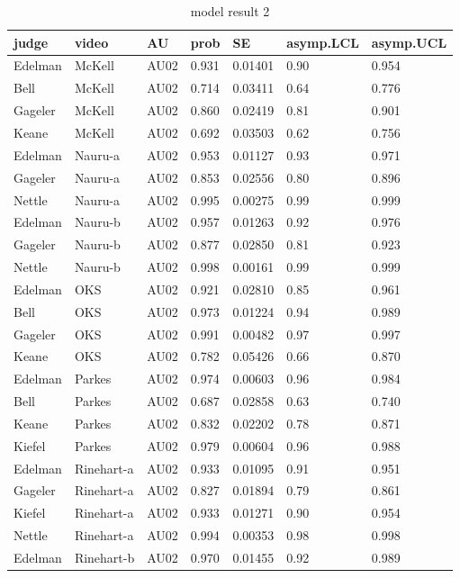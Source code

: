\documentclass{monashthesis}
\begin{document}
\begin{center}
\begin{longtable}{lllllll}
\caption{\label{tab:result_2} model result 2}\\
\toprule
judge & video & AU & prob & SE & asymp.LCL & asymp.UCL \\
\midrule
\endhead
\bottomrule
\endfoot
Edelman & McKell & AU02 & 0.931 & 0.01401 & 0.90 & 0.954 \\
Bell & McKell & AU02 & 0.714 & 0.03411 & 0.64 & 0.776 \\
Gageler & McKell & AU02 & 0.860 & 0.02419 & 0.81 & 0.901 \\
Keane & McKell & AU02 & 0.692 & 0.03503 & 0.62 & 0.756 \\
Edelman & Nauru-a & AU02 & 0.953 & 0.01127 & 0.93 & 0.971 \\
Gageler & Nauru-a & AU02 & 0.853 & 0.02556 & 0.80 & 0.896 \\
Nettle & Nauru-a & AU02 & 0.995 & 0.00275 & 0.99 & 0.999 \\
Edelman & Nauru-b & AU02 & 0.957 & 0.01263 & 0.92 & 0.976 \\
Gageler & Nauru-b & AU02 & 0.877 & 0.02850 & 0.81 & 0.923 \\
Nettle & Nauru-b & AU02 & 0.998 & 0.00161 & 0.99 & 0.999 \\
Edelman & OKS & AU02 & 0.921 & 0.02810 & 0.85 & 0.961 \\
Bell & OKS & AU02 & 0.973 & 0.01224 & 0.94 & 0.989 \\
Gageler & OKS & AU02 & 0.991 & 0.00482 & 0.97 & 0.997 \\
Keane & OKS & AU02 & 0.782 & 0.05426 & 0.66 & 0.870 \\
Edelman & Parkes & AU02 & 0.974 & 0.00603 & 0.96 & 0.984 \\
Bell & Parkes & AU02 & 0.687 & 0.02858 & 0.63 & 0.740 \\
Keane & Parkes & AU02 & 0.832 & 0.02202 & 0.78 & 0.871 \\
Kiefel & Parkes & AU02 & 0.979 & 0.00604 & 0.96 & 0.988 \\
Edelman & Rinehart-a & AU02 & 0.933 & 0.01095 & 0.91 & 0.951 \\
Gageler & Rinehart-a & AU02 & 0.827 & 0.01894 & 0.79 & 0.861 \\
Kiefel & Rinehart-a & AU02 & 0.933 & 0.01271 & 0.90 & 0.954 \\
Nettle & Rinehart-a & AU02 & 0.994 & 0.00353 & 0.98 & 0.998 \\
Edelman & Rinehart-b & AU02 & 0.970 & 0.01455 & 0.92 & 0.989 \\

\end{longtable}
\end{center}
\end{document}
